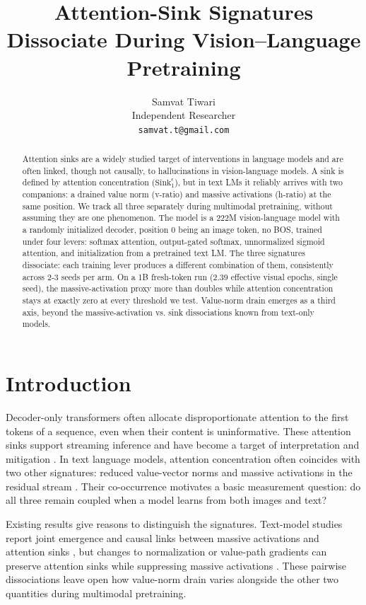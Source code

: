 \documentclass{article}
\title{Attention-Sink Signatures Dissociate During Vision--Language Pretraining}
\author{  Samvat Tiwari \\
  Independent Researcher \\
  \texttt{samvat.t@gmail.com} \\
}
\begin{document}
\maketitle


\begin{abstract}
Attention sinks are a widely studied target of interventions in language models and are often linked, though not causally, to hallucinations in vision-language models. A sink is defined by attention concentration ($\mathrm{Sink}^{\epsilon}_{1}$), but in text LMs it reliably arrives with two companions: a drained value norm (v-ratio) and massive activations (h-ratio) at the same position. We track all three separately during multimodal pretraining, without assuming they are one phenomenon. The model is a 222M vision-language model with a randomly initialized decoder, position 0 being an image token, no BOS, trained under four levers: softmax attention, output-gated softmax, unnormalized sigmoid attention, and initialization from a pretrained text LM. The three signatures dissociate: each training lever produces a different combination of them, consistently across 2-3 seeds per arm. On a 1B fresh-token run (2.39 effective visual epochs, single seed), the massive-activation proxy more than doubles while attention concentration stays at exactly zero at every threshold we test. Value-norm drain emerges as a third axis, beyond the massive-activation vs. sink dissociations known from text-only models.
\end{abstract}


\section{Introduction}

Decoder-only transformers often allocate disproportionate attention to the first tokens of a sequence, even when their content is uninformative. These attention sinks support streaming inference \cite{ref1} and have become a target of interpretation and mitigation \cite{ref3}. In text language models, attention concentration often coincides with two other signatures: reduced value-vector norms \cite{ref4,ref6} and massive activations in the residual stream \cite{ref2,ref5}. Their co-occurrence motivates a basic measurement question: do all three remain coupled when a model learns from both images and text?

Existing results give reasons to distinguish the signatures. Text-model studies report joint emergence and causal links between massive activations and attention sinks \cite{ref7,ref8}, but changes to normalization or value-path gradients can preserve attention sinks while suppressing massive activations \cite{ref9,ref10}. These pairwise dissociations leave open how value-norm drain varies alongside the other two quantities during multimodal pretraining.
\end{document}
